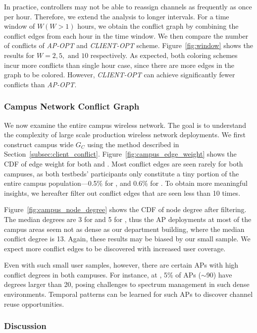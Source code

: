 In practice, controllers may not be able to reassign channels as frequently as
once
per hour. Therefore, we extend the analysis to longer intervals. For a time
window of $W (W>1)$ hours, we obtain the conflict graph by combining the
conflict edges from each hour in the time window. We then compare the number of
conflicts of \textit{AP-OPT} and \textit{CLIENT-OPT} scheme.
Figure~\ref{fig:window} shows the results for $W=2, 5, \text{ and } 10$
respectively. As expected, both coloring schemes incur more conflicts than
single hour case, since there are more edges in the graph to be colored.
However, \textit{CLIENT-OPT} can achieve significantly fewer conflicts than
\textit{AP-OPT}.

\subsubsection{Campus Network Conflict Graph}

We now examine the entire campus wireless network. The goal is to understand
the complexity of large scale production wireless network deployments. We
first construct campus wide $G_C$ using the method described in
Section~\ref{subsec:client_conflict}. Figure~\ref{fig:campus_edge_weight}
shows the CDF of edge weight for both \ub{} and \nd{}. Most conflict edges are seen
rarely for both campuses, as both testbeds' participants only constitute a
tiny portion of the entire campus population---0.5\% for \nd{}, and 0.6\% for
\ub{}. To obtain more meaningful insights, we hereafter filter out conflict
edges that are seen less than 10 times.

Figure~\ref{fig:campus_node_degree} shows the CDF of node degree after
filtering. The median degrees are 3 for \nd{} and 5 for \ub{}, thus the AP
deployments at most of the campus areas seem not as dense as our department
building, where the median conflict degree is 13. Again, these results may be
biased by our small sample. We expect more conflict edges to be discovered with
increased user coverage.

Even with such small user samples, however, there are certain APs with high
conflict degrees in both campuses. For instance, at \ub{}, 5\% of APs ($\sim$90)
have degrees larger than 20, posing challenges to spectrum management in such
dense environments. Temporal patterns can be learned for such APs to discover
channel reuse opportunities.


\subsubsection{Discussion}

